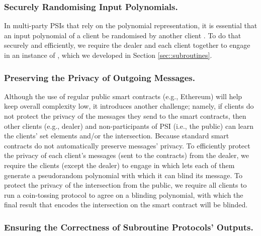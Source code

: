  
 
 
 \subsubsection{Securely Randomising Input Polynomials.}  In multi-party PSIs that rely on the polynomial representation, it is essential that an input polynomial of a client be randomised by another client \cite{AbadiMZ21}. To do that securely and efficiently, we require the dealer and each client together to engage in an instance of \vopr, which we developed in Section \ref{sec::subroutines}. 
 
 \subsubsection{Preserving the Privacy of Outgoing Messages.} Although the use of regular public smart contracts (e.g., Ethereum) will help keep overall complexity low, it introduces another challenge; namely, if clients do not protect the privacy of the messages they send to the smart contracts, then other clients (e.g., dealer) and non-participants of PSI (i.e., the public) can learn the clients' set elements and/or the intersection. Because standard smart contracts do not automatically preserve messages' privacy. To efficiently protect the privacy of each client's messages (sent to the contracts) from the dealer, we require the clients (except the dealer) to engage in \zspaa which lets each of them generate a pseudorandom polynomial with which it can blind its message. To protect the privacy of the intersection from the public, we require all clients to run a coin-tossing protocol to agree on a blinding polynomial, with which the final result that encodes the intersection on the smart contract will be blinded.  
 
 \subsubsection{Ensuring the Correctness of Subroutine Protocols' Outputs.} 
 
